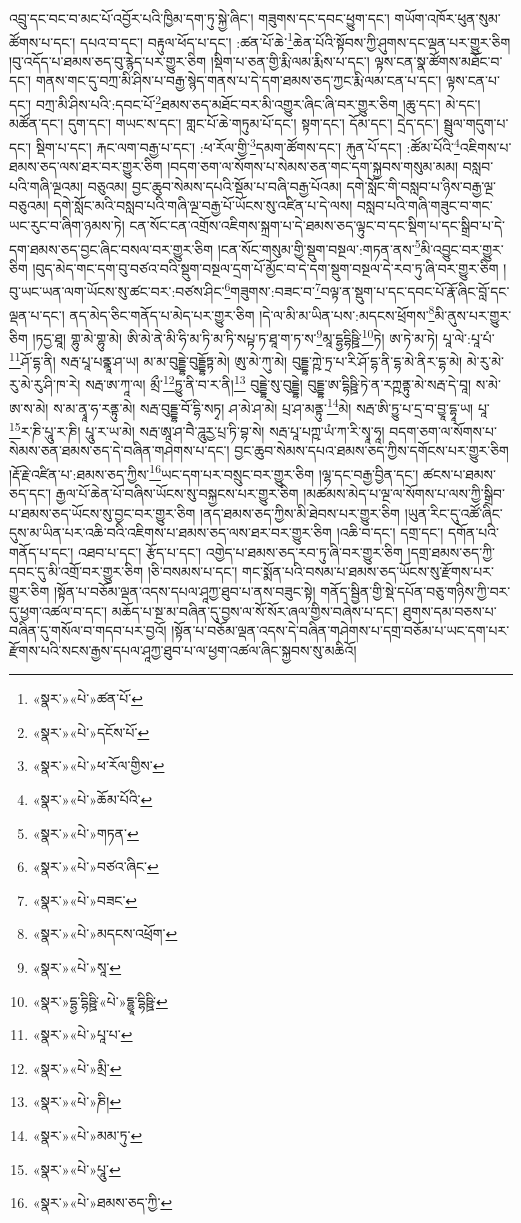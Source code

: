 འབྲུ་དང་བང་བ་མང་པོ་འབྱོར་པའི་ཁྱིམ་དག་ཏུ་སྐྱེ་ཞིང་། གཟུགས་དང་དབང་ཕྱུག་དང་། གཡོག་འཁོར་ཕུན་སུམ་ཚོགས་པ་དང་། དཔའ་བ་དང་། བརྟུལ་ཕོད་པ་དང་། :ཚན་པོ་ཆེ་\footnote{«སྣར་»«པེ་»ཚན་པོ་}ཆེན་པོའི་སྟོབས་ཀྱི་ཤུགས་དང་ལྡན་པར་གྱུར་ཅིག །བུ་འདོད་པ་ཐམས་ཅད་བུ་རྙེད་པར་གྱུར་ཅིག །སྡིག་པ་ཅན་གྱི་རྨི་ལམ་རྨིས་པ་དང་། ལྟས་ངན་སྣ་ཚོགས་མཐོང་བ་དང་། གནས་གང་དུ་བཀྲ་མི་ཤིས་པ་བརྒྱ་སྙེད་གནས་པ་དེ་དག་ཐམས་ཅད་ཀྱང་རྨི་ལམ་ངན་པ་དང་། ལྟས་ངན་པ་དང་། བཀྲ་མི་ཤིས་པའི་:དབང་པོ་\footnote{«སྣར་»«པེ་»དངོས་པོ་}ཐམས་ཅད་མཐོང་བར་མི་འགྱུར་ཞིང་ཞི་བར་གྱུར་ཅིག །ཆུ་དང་། མེ་དང་། མཚོན་དང་། དུག་དང་། གཡང་ས་དང་། གླང་པོ་ཆེ་གཏུམ་པོ་དང་། སྟག་དང་། དོམ་དང་། དྲེད་དང་། སྦྲུལ་གདུག་པ་དང་། སྡིག་པ་དང་། རྐང་ལག་བརྒྱ་པ་དང་། :ཕ་རོལ་གྱི་\footnote{«སྣར་»«པེ་»ཕ་རོལ་གྱིས་}དམག་ཚོགས་དང་། རྐུན་པོ་དང་། :ཚོམ་པོའི་\footnote{«སྣར་»«པེ་»ཆོམ་པོའི་}འཇིགས་པ་ཐམས་ཅད་ལས་ཐར་བར་གྱུར་ཅིག །བདག་ཅག་ལ་སོགས་པ་སེམས་ཅན་གང་དག་སྐྱབས་གསུམ་མམ། བསླབ་པའི་གཞི་ལྔའམ། བཅུའམ། བྱང་ཆུབ་སེམས་དཔའི་སྡོམ་པ་བཞི་བརྒྱ་པོའམ། དགེ་སློང་གི་བསླབ་པ་ཉིས་བརྒྱ་ལྔ་བཅུའམ། དགེ་སློང་མའི་བསླབ་པའི་གཞི་ལྔ་བརྒྱ་པོ་ཡོངས་སུ་འཛིན་པ་དེ་ལས། བསླབ་པའི་གཞི་གཟུང་བ་གང་ཡང་རུང་བ་ཞིག་ཉམས་ཏེ། ངན་སོང་ངན་འགྲོས་འཇིགས་སྐྲག་པ་དེ་ཐམས་ཅད་ལྟུང་བ་དང་སྡིག་པ་དང་སྒྲིབ་པ་དེ་དག་ཐམས་ཅད་བྱང་ཞིང་བསལ་བར་གྱུར་ཅིག །ངན་སོང་གསུམ་གྱི་སྡུག་བསྔལ་:གཏན་ནས་\footnote{«སྣར་»«པེ་»གཏན་}མི་འབྱུང་བར་གྱུར་ཅིག །བུད་མེད་གང་དག་བུ་བཙའ་བའི་སྡུག་བསྔལ་དྲག་པོ་མྱོང་བ་དེ་དག་སྡུག་བསྔལ་དེ་རབ་ཏུ་ཞི་བར་གྱུར་ཅིག །བུ་ཡང་ཡན་ལག་ཡོངས་སུ་ཚང་བར་:བཙས་ཤིང་\footnote{«སྣར་»«པེ་»བཙའ་ཞིང་}གཟུགས་:བཟང་བ་\footnote{«སྣར་»«པེ་»བཟང་}བལྟ་ན་སྡུག་པ་དང་དབང་པོ་རྣོ་ཞིང་བློ་དང་ལྡན་པ་དང་། ནད་མེད་ཅིང་གནོད་པ་མེད་པར་གྱུར་ཅིག །དེ་ལ་མི་མ་ཡིན་པས་:མདངས་ཕྲོགས་\footnote{«སྣར་»«པེ་»མདངས་འཕྲོག་}མི་ནུས་པར་གྱུར་ཅིག །ཏདྱ་ཐཱ། གྷུ་མེ་གྷུ་མེ། ཨི་མེ་ནེ་མི་ཧི་མ་ཏི་མ་ཏི་སཔྟ་ཏ་ཐཱ་ག་ཏ་ས་\footnote{«སྣར་»«པེ་»སཱ་}མཱ་དྷྱདྷིཥྛི་\footnote{«སྣར་»དྷྱ་དྷིཥྛི་«པེ་»དྷྱཱ་དྷིཥྛི་}ཏེ། ཨ་ཏེ་མ་ཏེ། པཱ་ལེ་:པཱ་པཾ་\footnote{«སྣར་»«པེ་»པཱ་པ་}ཤོ་དྷ་ནི། སརྦ་པཱ་པནྣཱ་ཤ་ཡ། མ་མ་བུདྡྷེ་བུདྡྷོཏྟ་མེ། ཨུ་མེ་ཀུ་མེ། བུདྡྷ་ཀྵེ་ཏྲ་པ་རི་ཤོ་དྷ་ནི་དྷ་མེ་ནིར་དྷ་མེ། མེ་རུ་མེ་རུ་མེ་རུ་ཤི་ཁ་རེ། སརྦ་ཨ་ཀཱ་ལ། མྲྀ་\footnote{«སྣར་»«པེ་»མྲི་}ཏྱུ་ནི་བ་ར་ནི།\footnote{«སྣར་»«པེ་»ཎི།} བུདྡྷེ་སུ་བུདྡྷེ། བུདྡྷ་ཨ་དྷིཥྛི་ཏེ་ན་རཀྵནྟུ་མེ་སརྦ་དེ་བཱ། ས་མེ་ཨ་ས་མེ། ས་མ་ནྭཱ་ཧ་རནྟུ་མེ། སརྦ་བུདྡྷ་བོ་དྷི་སཏྭ། ཤ་མེ་ཤ་མེ། པྲ་ཤ་མནྟུ་\footnote{«སྣར་»«པེ་»མམ་ཏུ་}མེ། སརྦ་ཨི་ཏྱུ་པ་དྲ་བ་བྱཱ་དྷཱ་ཡ། པཱ་\footnote{«སྣར་»«པེ་»པཱུ་}ར་ཎི་པཱུ་ར་ཎི། པཱུ་ར་ཡ་མེ། སརྦ་ཨཱ་ཤ་བཻ་ཌཱུརྱ་པྲ་ཏི་བྷ་སེ། སརྦ་པཱ་པཀྵ་ཡཾ་ཀ་རི་སྭཱ་ཧཱ། བདག་ཅག་ལ་སོགས་པ་སེམས་ཅན་ཐམས་ཅད་དེ་བཞིན་གཤེགས་པ་དང་། བྱང་ཆུབ་སེམས་དཔའ་ཐམས་ཅད་ཀྱིས་དགོངས་པར་གྱུར་ཅིག །རྡོ་རྗེ་འཛིན་པ་:ཐམས་ཅད་ཀྱིས་\footnote{«སྣར་»«པེ་»ཐམས་ཅད་ཀྱི་}ཡང་དག་པར་བསྲུང་བར་གྱུར་ཅིག །ལྷ་དང་བརྒྱ་བྱིན་དང་། ཚངས་པ་ཐམས་ཅད་དང་། རྒྱལ་པོ་ཆེན་པོ་བཞིས་ཡོངས་སུ་བསྐྱངས་པར་གྱུར་ཅིག །མཚམས་མེད་པ་ལྔ་ལ་སོགས་པ་ལས་ཀྱི་སྒྲིབ་པ་ཐམས་ཅད་ཡོངས་སུ་བྱང་བར་གྱུར་ཅིག །ནད་ཐམས་ཅད་ཀྱིས་མི་ཐེབས་པར་གྱུར་ཅིག །ཡུན་རིང་དུ་འཚོ་ཞིང་དུས་མ་ཡིན་པར་འཆི་བའི་འཇིགས་པ་ཐམས་ཅད་ལས་ཐར་བར་གྱུར་ཅིག །འཆི་བ་དང་། དགྲ་དང་། དགོན་པའི་གནོད་པ་དང་། འཐབ་པ་དང་། རྩོད་པ་དང་། འགྱེད་པ་ཐམས་ཅད་རབ་ཏུ་ཞི་བར་གྱུར་ཅིག །དགྲ་ཐམས་ཅད་ཀྱི་དབང་དུ་མི་འགྲོ་བར་གྱུར་ཅིག །ཅི་བསམས་པ་དང་། གང་སྨོན་པའི་བསམ་པ་ཐམས་ཅད་ཡོངས་སུ་རྫོགས་པར་གྱུར་ཅིག །སྟོན་པ་བཅོམ་ལྡན་འདས་དཔལ་ཤཱཀྱ་ཐུབ་པ་ནས་བཟུང་སྟེ། གནོད་སྦྱིན་གྱི་སྡེ་དཔོན་བཅུ་གཉིས་ཀྱི་བར་དུ་ཕྱག་འཚལ་བ་དང་། མཆོད་པ་སྔ་མ་བཞིན་དུ་བྱས་ལ་སོ་སོར་ཞལ་གྱིས་བཞེས་པ་དང་། ཐུགས་དམ་བཅས་པ་བཞིན་དུ་གསོལ་བ་གདབ་པར་བྱའོ། །སྟོན་པ་བཅོམ་ལྡན་འདས་དེ་བཞིན་གཤེགས་པ་དགྲ་བཅོམ་པ་ཡང་དག་པར་རྫོགས་པའི་སངས་རྒྱས་དཔལ་ཤཱཀྱ་ཐུབ་པ་ལ་ཕྱག་འཚལ་ཞིང་སྐྱབས་སུ་མཆིའོ། 